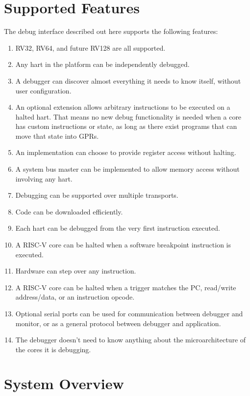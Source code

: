\documentclass{article}
\begin{document}
\section{Supported Features}
The debug interface described out here supports the following features:
\begin{enumerate}
   \item RV32, RV64, and future RV128 are all supported.
   \item Any hart in the platform can be independently debugged.
   \item A debugger can discover almost everything it needs to know itself,
       without user configuration.
   \item An optional extension allows arbitrary instructions to be executed on
       a halted hart. That means no new debug functionality is needed when a
       core has custom instructions or state, as long as there exist programs
       that can move that state into GPRs.
   \item An implementation can choose to provide register access without
       halting.
   \item A system bus master can be implemented to allow memory access without
       involving any hart.
   \item Debugging can be supported over multiple transports.
   \item Code can be downloaded efficiently.
   \item Each hart can be debugged from the very first instruction executed.
   \item A RISC-V core can be halted when a software breakpoint instruction is
       executed.
   \item Hardware can step over any instruction.
   \item A RISC-V core can be halted when a trigger matches the PC, read/write
       address/data, or an instruction opcode.
   \item Optional serial ports can be used for communication between debugger
       and monitor, or as a general protocol between debugger and application.
   \item The debugger doesn't need to know anything about the microarchitecture
       of the cores it is debugging.
\end{enumerate}

\section{System Overview} \label{overview}
\end{document}
